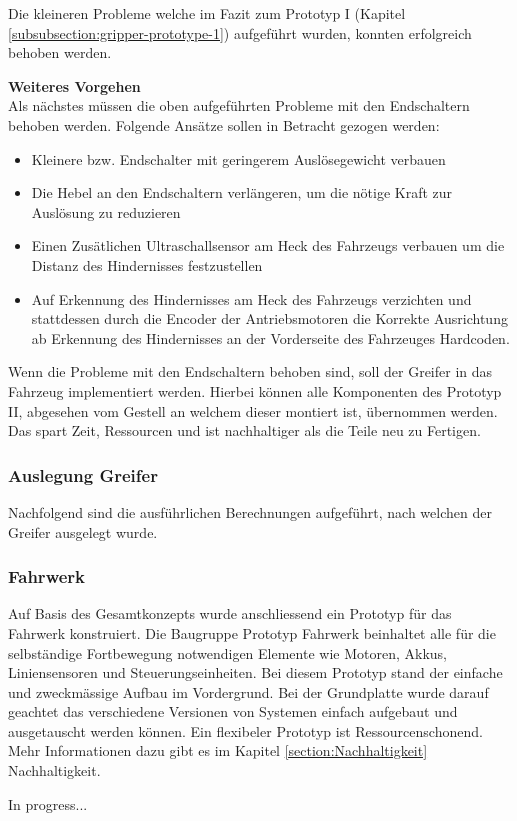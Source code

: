 Die kleineren Probleme welche im Fazit zum Prototyp I (Kapitel \ref{subsubsection:gripper-prototype-1}) aufgeführt wurden, konnten erfolgreich behoben werden.

\textbf{Weiteres Vorgehen}\\

Als nächstes müssen die oben aufgeführten Probleme mit den Endschaltern behoben werden. Folgende Ansätze sollen in Betracht gezogen werden:
\begin{itemize}
    \item Kleinere bzw. Endschalter mit geringerem Auslösegewicht verbauen
    \item Die Hebel an den Endschaltern verlängeren, um die nötige Kraft zur Auslösung zu reduzieren
    \item Einen Zusätlichen Ultraschallsensor am Heck des Fahrzeugs verbauen um die Distanz des Hindernisses festzustellen
    \item Auf Erkennung des Hindernisses am Heck des Fahrzeugs verzichten und stattdessen durch die Encoder der Antriebsmotoren die Korrekte Ausrichtung ab Erkennung des Hindernisses an der Vorderseite des Fahrzeuges Hardcoden.
\end{itemize}

Wenn die Probleme mit den Endschaltern behoben sind, soll der Greifer in das Fahrzeug implementiert werden. Hierbei können alle Komponenten des Prototyp II, abgesehen vom Gestell an welchem dieser montiert ist, übernommen werden. Das spart Zeit, Ressourcen und ist nachhaltiger als die Teile neu zu Fertigen.


\subsubsection{Auslegung Greifer}
\label{subsubsection:gripper-calculations}

Nachfolgend sind die ausführlichen Berechnungen aufgeführt, nach welchen der Greifer ausgelegt wurde.



\subsubsection{Fahrwerk}

Auf Basis des Gesamtkonzepts wurde anschliessend ein Prototyp für das Fahrwerk konstruiert. Die Baugruppe Prototyp Fahrwerk beinhaltet alle für die selbständige Fortbewegung notwendigen Elemente wie Motoren, Akkus, Liniensensoren und Steuerungseinheiten.  Bei diesem Prototyp stand der einfache und zweckmässige Aufbau im Vordergrund. Bei der Grundplatte wurde darauf geachtet das verschiedene  Versionen von Systemen einfach aufgebaut und ausgetauscht werden können. Ein flexibeler Prototyp ist Ressourcenschonend. Mehr Informationen dazu gibt es im Kapitel \ref{section:Nachhaltigkeit} Nachhaltigkeit. 

In progress...
